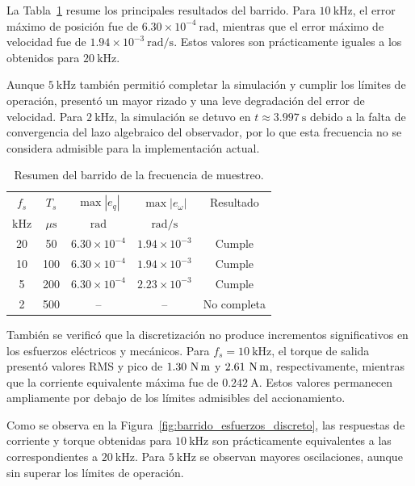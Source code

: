\documentclass[10pt,a4paper]{article}
\begin{document}
La Tabla~\ref{tab:resumen_muestreo_discreto} resume los principales resultados
del barrido. Para \(10~\text{kHz}\), el error máximo de posición fue de
\(6.30\times10^{-4}~\text{rad}\), mientras que el error máximo de velocidad fue
de \(1.94\times10^{-3}~\text{rad/s}\). Estos valores son prácticamente iguales
a los obtenidos para \(20~\text{kHz}\).

Aunque \(5~\text{kHz}\) también permitió completar la simulación y cumplir los
límites de operación, presentó un mayor rizado y una leve degradación del error
de velocidad. Para \(2~\text{kHz}\), la simulación se detuvo en
\(t\approx3.997~\text{s}\) debido a la falta de convergencia del lazo algebraico
del observador, por lo que esta frecuencia no se considera admisible para la
implementación actual.

\begin{table}[htbp]
	\centering
	\caption{Resumen del barrido de la frecuencia de muestreo.}
	\label{tab:resumen_muestreo_discreto}
	\small
	\begin{tabular}{ccccc}
		\toprule
		\(f_s\) &
		\(T_s\) &
		\(\max |e_q|\) &
		\(\max |e_{\omega}|\) &
		Resultado \\
		\(\text{kHz}\) &
		\(\mu\text{s}\) &
		\(\text{rad}\) &
		\(\text{rad/s}\) & \\
		\midrule
		20 & 50  & \(6.30\times10^{-4}\) & \(1.94\times10^{-3}\) & Cumple \\
		10 & 100 & \(6.30\times10^{-4}\) & \(1.94\times10^{-3}\) & Cumple \\
		5  & 200 & \(6.30\times10^{-4}\) & \(2.23\times10^{-3}\) & Cumple \\
		2  & 500 & -- & -- & No completa \\
		\bottomrule
	\end{tabular}
\end{table}

También se verificó que la discretización no produce incrementos significativos
en los esfuerzos eléctricos y mecánicos. Para \(f_s=10~\text{kHz}\), el torque
de salida presentó valores RMS y pico de \(1.30~\text{N\,m}\) y
\(2.61~\text{N\,m}\), respectivamente, mientras que la corriente equivalente
máxima fue de \(0.242~\text{A}\). Estos valores permanecen ampliamente por
debajo de los límites admisibles del accionamiento.

Como se observa en la Figura~\ref{fig:barrido_esfuerzos_discreto}, las
respuestas de corriente y torque obtenidas para \(10~\text{kHz}\) son
prácticamente equivalentes a las correspondientes a \(20~\text{kHz}\).
Para \(5~\text{kHz}\) se observan mayores oscilaciones, aunque sin superar los
límites de operación.
\end{document}
